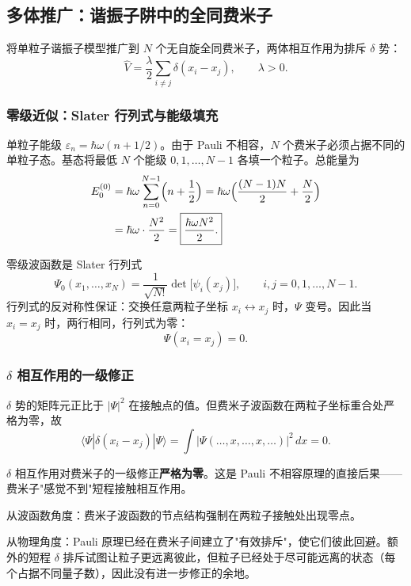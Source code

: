 \subsection{多体推广：谐振子阱中的全同费米子}

将单粒子谐振子模型推广到 $N$ 个无自旋全同费米子，两体相互作用为排斥 $\delta$ 势：
\[
\hat{V} = \frac{\lambda}{2}\sum_{i\neq j}\delta(x_i-x_j),
\qquad \lambda>0.
\]

\subsubsection{零级近似：Slater 行列式与能级填充}

单粒子能级 $\varepsilon_n = \hbar\omega(n+1/2)$。由于 Pauli 不相容，$N$ 个费米子必须占据不同的单粒子态。基态将最低 $N$ 个能级 $0,1,\dots,N-1$ 各填一个粒子。总能量为
\begin{align}
E_0^{(0)} &= \hbar\omega\sum_{n=0}^{N-1}\Bigl(n+\frac12\Bigr)
= \hbar\omega\Bigl(\frac{(N-1)N}{2} + \frac{N}{2}\Bigr) \\
&= \hbar\omega\cdot\frac{N^2}{2}
= \boxed{\frac{\hbar\omega N^2}{2}.}
\end{align}

零级波函数是 Slater 行列式
\[
\Psi_0(x_1,\dots,x_N) = \frac{1}{\sqrt{N!}}\det\bigl[\psi_i(x_j)\bigr],
\qquad i,j=0,1,\dots,N-1.
\]
行列式的反对称性保证：交换任意两粒子坐标 $x_i\leftrightarrow x_j$ 时，$\Psi$ 变号。因此当 $x_i=x_j$ 时，两行相同，行列式为零：
\begin{equation}
\Psi(x_i=x_j) = 0.
\end{equation}

\subsubsection{$\delta$ 相互作用的一级修正}

$\delta$ 势的矩阵元正比于 $|\Psi|^2$ 在接触点的值。但费米子波函数在两粒子坐标重合处严格为零，故
\[
\langle\Psi|\delta(x_i-x_j)|\Psi\rangle = \int|\Psi(\dots,x,\dots,x,\dots)|^2\,dx = 0.
\]

$\delta$ 相互作用对费米子的一级修正\textbf{严格为零}。这是 Pauli 不相容原理的直接后果——费米子"感觉不到"短程接触相互作用。

\begin{insightbox}
从波函数角度：费米子波函数的节点结构强制在两粒子接触处出现零点。

从物理角度：Pauli 原理已经在费米子间建立了"有效排斥"，使它们彼此回避。额外的短程 $\delta$ 排斥试图让粒子更远离彼此，但粒子已经处于尽可能远离的状态（每个占据不同量子数），因此没有进一步修正的余地。
\end{insightbox}

